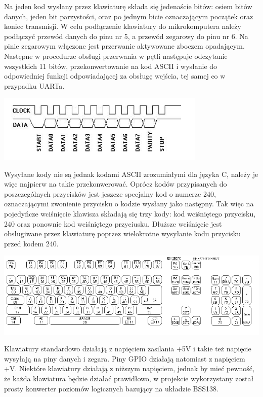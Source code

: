 \documentclass[shortabstract]{iithesis}
\begin{document}
Na jeden kod wysłany przez klawiaturę składa się jedenaście bitów: osiem bitów danych, jeden bit parzystości, oraz po jednym bicie oznaczającym początek oraz koniec transmisji. W celu podłączenie klawiatury do mikrokomputera należy podłączyć przewód danych do pinu nr 5, a przewód zegarowy do pinu nr 6. Na pinie zegarowym włączone jest przerwanie aktywowane zboczem opadającym. Następne w procedurze obsługi przerwania w pętli następuje odczytanie wszystkich 11 bitów, przekonwertowanie na kod ASCII i wysłanie do odpowiedniej funkcji odpowiadającej za obsługę wejścia, tej samej co w przypadku UARTa.

\begingroup
\centering
\includegraphics[width=0.75\textwidth]{signals.png}
\endgroup

Wysyłane kody nie są jednak kodami ASCII zrozumiałymi dla języka C, należy je więc najpierw na takie przekonwerować. Oprócz kodów przypisanych do poszczególnych przycisków jest jeszcze specjalny kod o numerze 240, oznaczającymi zwonienie przycisku o kodzie wysłany jako następny. Tak więc na pojedyńcze wciśnięcie klawisza składają się trzy kody: kod wciśniętego przycisku, 240 oraz ponownie kod wciśniętego przyciusku. Dłuższe wciśnięcie jest obsługiwane przez klawiaturę poprzez wielokrotne wysyłanie kodu przycisku przed kodem 240.

\includegraphics[width=\textwidth]{scancode.png}

Klawiatury standardowo działają z napięciem zasilania +5V i takie też napięcie wysyłają na piny danych i zegara. Piny GPIO działają natomiast z napięciem +V. Niektóre klawiatury działają z niższym napięciem, jednak by mieć pewność, że każda klawiatura będzie działać prawidłowo, w projekcie wykorzystany został prosty konwerter poziomów logicznych bazujący na układzie BSS138.
 
\end{document}
